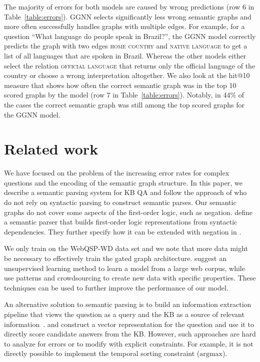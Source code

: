 \documentclass[11pt]{article}
\begin{document}
The majority of errors for both models are caused by wrong predictions (row 6 in Table~\ref{table:errors}). GGNN selects significantly less wrong semantic graphs and more often successfully handles graphs with multiple edges. For example, for a question ``What language do people speak in Brazil?'', the GGNN model correctly predicts the graph with two edges \textsc{home country} and \textsc{native language} to get a list of all languages that are spoken in Brazil. Whereas the other models either select the relation \textsc{official language} that returns only the official language of the country or choose a wrong interpretation altogether.
We also look at the hit@10 measure that shows how often the correct semantic graph was in the top 10 scored graphs by the model (row 7 in Table~\ref{table:errors}). Notably, in 44\% of the cases the correct semantic graph was still among the top scored graphs for the GGNN model. 




\section{Related work} 

We have focused on the problem of the increasing error rates for complex questions and the encoding of the semantic graph structure. 
In this paper, we describe a semantic parsing system for KB QA and follow the approach of  who do not rely on syntactic parsing to construct semantic parses. Our semantic graphs do not cover some aspects of the first-order logic, such as negation. 
 define a semantic parser that builds first-order logic representations from syntactic dependencies. They further specify how it can be extended with negation in \mbox{}.

We only train on the WebQSP-WD data set and we note that more data might be necessary to effectively train the gated graph architecture.  suggest an unsupervised learning method to learn a model from a large web corpus, while  use patterns and crowdsourcing to create new data with specific properties. These techniques can be used to further improve the performance of our model.

An alternative solution to semantic parsing is to build an information extraction pipeline that views the question as a query and the KB as a source of relevant information~\cite{Yao2014a}.  and  construct a vector representation for the question and use it to directly score candidate answers from the KB. However, such approaches are hard to analyze for errors or to modify with explicit constraints. For example, it is not directly possible to implement the temporal sorting constraint ($\mathrm{argmax}$).
\end{document}
